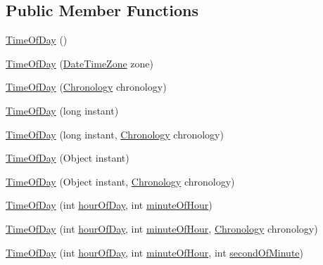 \subsection*{Public Member Functions}
\begin{DoxyCompactItemize}
\item 
\hyperlink{classorg_1_1joda_1_1time_1_1_time_of_day_a53852030eac05dd7c418237c3c2b7cce}{Time\-Of\-Day} ()
\item 
\hyperlink{classorg_1_1joda_1_1time_1_1_time_of_day_ad4ab938cd9e4c8b10ae6c71f5feec561}{Time\-Of\-Day} (\hyperlink{classorg_1_1joda_1_1time_1_1_date_time_zone}{Date\-Time\-Zone} zone)
\item 
\hyperlink{classorg_1_1joda_1_1time_1_1_time_of_day_aef2952ec6c922b74fcd8237c801410a8}{Time\-Of\-Day} (\hyperlink{classorg_1_1joda_1_1time_1_1_chronology}{Chronology} chronology)
\item 
\hyperlink{classorg_1_1joda_1_1time_1_1_time_of_day_ad33894f2adfd2853d3f7a5170b108383}{Time\-Of\-Day} (long instant)
\item 
\hyperlink{classorg_1_1joda_1_1time_1_1_time_of_day_ac6ad3251130ddbf78cb9bed7e1123df4}{Time\-Of\-Day} (long instant, \hyperlink{classorg_1_1joda_1_1time_1_1_chronology}{Chronology} chronology)
\item 
\hyperlink{classorg_1_1joda_1_1time_1_1_time_of_day_ad04f76057a640ff20a858d5f28479c1b}{Time\-Of\-Day} (Object instant)
\item 
\hyperlink{classorg_1_1joda_1_1time_1_1_time_of_day_a0b709fe5b26fc1fc3aab8150e9b9ef9a}{Time\-Of\-Day} (Object instant, \hyperlink{classorg_1_1joda_1_1time_1_1_chronology}{Chronology} chronology)
\item 
\hyperlink{classorg_1_1joda_1_1time_1_1_time_of_day_a19805a4782696f5cbf9d42d243d36e49}{Time\-Of\-Day} (int \hyperlink{classorg_1_1joda_1_1time_1_1_time_of_day_a8dd140a8112cba92d90d8bcb00a1764b}{hour\-Of\-Day}, int \hyperlink{classorg_1_1joda_1_1time_1_1_time_of_day_ac30a9f76ce74ec5b0337a7e860b9668f}{minute\-Of\-Hour})
\item 
\hyperlink{classorg_1_1joda_1_1time_1_1_time_of_day_a1c0eccaa9079014fd1c6e215563207df}{Time\-Of\-Day} (int \hyperlink{classorg_1_1joda_1_1time_1_1_time_of_day_a8dd140a8112cba92d90d8bcb00a1764b}{hour\-Of\-Day}, int \hyperlink{classorg_1_1joda_1_1time_1_1_time_of_day_ac30a9f76ce74ec5b0337a7e860b9668f}{minute\-Of\-Hour}, \hyperlink{classorg_1_1joda_1_1time_1_1_chronology}{Chronology} chronology)
\item 
\hyperlink{classorg_1_1joda_1_1time_1_1_time_of_day_a805a375f7464d598894dd0818ecfb117}{Time\-Of\-Day} (int \hyperlink{classorg_1_1joda_1_1time_1_1_time_of_day_a8dd140a8112cba92d90d8bcb00a1764b}{hour\-Of\-Day}, int \hyperlink{classorg_1_1joda_1_1time_1_1_time_of_day_ac30a9f76ce74ec5b0337a7e860b9668f}{minute\-Of\-Hour}, int \hyperlink{classorg_1_1joda_1_1time_1_1_time_of_day_af0c5da02c644c96420b4faa14b9a58b2}{second\-Of\-Minute})

\end{DoxyCompactItemize}
